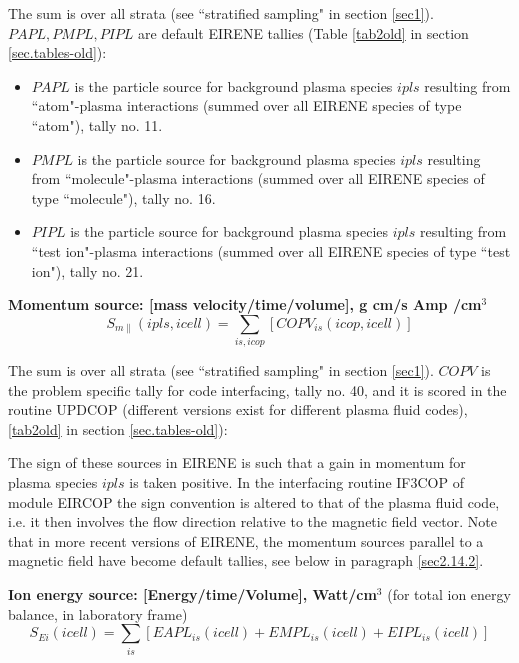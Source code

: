  The sum is over all strata (see  ``stratified sampling" in section \ref{sec1}). $PAPL, PMPL,  PIPL$ are default EIRENE tallies (Table \ref{tab2old} in section \ref{sec.tables-old}):
 \begin{itemize}
 \item
 $PAPL$ is the particle source for background plasma species $ipls$ resulting from ``atom"-plasma interactions (summed over all EIRENE species of type ``atom"), tally no. 11.
 \item
 $PMPL$ is the particle source for background plasma species $ipls$ resulting from ``molecule"-plasma interactions (summed over all EIRENE species of type ``molecule"), tally no. 16.
 \item
 $PIPL$ is the particle source for background plasma species $ipls$ resulting from ``test ion"-plasma interactions (summed over all EIRENE species of type ``test ion"), tally no. 21.
 \end{itemize}
\textbf{Momentum source: [mass velocity/time/volume], g cm/s Amp /cm$^3$}
 \begin{equation}\label{Sm}
 S_{m\parallel}(ipls,icell) = \sum_{is,icop} \left[COPV_{is}(icop,icell) \right]
 \end{equation}

 The sum is over all strata (see  ``stratified sampling" in section \ref{sec1}). $COPV$ is the problem specific tally for code interfacing, tally no. 40,
 and it is scored in the routine UPDCOP (different versions exist for different plasma fluid codes), \ref{tab2old} in section \ref{sec.tables-old}):

 The sign of these sources in EIRENE is such that a gain in momentum for plasma species $ipls$ is taken positive. In the interfacing routine IF3COP of module EIRCOP the sign convention
 is altered to that of the plasma fluid code, i.e. it then involves
 the flow direction relative to the magnetic field vector. Note that in more recent versions
 of EIRENE, the momentum sources parallel to a magnetic field have become default tallies,
 see below in paragraph  \ref{sec2.14.2}.

\textbf{Ion energy source: [Energy/time/Volume], Watt/cm$^3$} (for total ion energy balance, in laboratory frame)
\begin{equation}
 S_{Ei}(icell) = \sum_{is} \left[EAPL_{is}(icell) + EMPL_{is}(icell) + EIPL_{is}(icell) \right]
 \end{equation}

